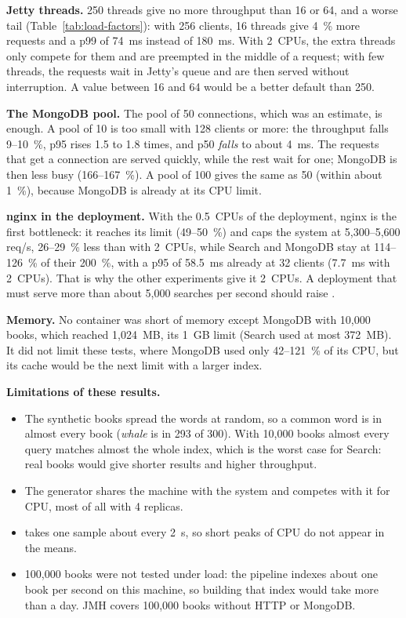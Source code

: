 \textbf{Jetty threads.} 250 threads give no more throughput than 16 or 64, and a worse tail
(Table~\ref{tab:load-factors}): with 256 clients, 16 threads give 4~\% more requests and a p99 of 74~ms instead of
180~ms. With 2~CPUs, the extra threads only compete for them and are preempted in the middle of a request; with few
threads, the requests wait in Jetty's queue and are then served without interruption. A value between 16 and 64 would
be a better default than 250.

\textbf{The MongoDB pool.} The pool of 50 connections, which was an estimate, is enough. A pool of 10 is too small with
128 clients or more: the throughput falls 9--10~\%, p95 rises 1.5 to 1.8 times, and p50 \emph{falls} to about 4~ms.
The requests that get a connection are served quickly, while the rest wait for one; MongoDB is then less busy
(166--167~\%). A pool of 100 gives the same as 50 (within about 1~\%), because MongoDB is already at its CPU limit.

\textbf{nginx in the deployment.} With the 0.5~CPUs of the deployment, nginx is the first bottleneck: it reaches its
limit (49--50~\%) and caps the system at 5,300--5,600 req/s, 26--29~\% less than with 2~CPUs, while Search
and MongoDB stay at 114--126~\% of their 200~\%, with a p95 of 58.5~ms
already at 32 clients (7.7~ms with 2~CPUs). That is why the other experiments give it 2~CPUs. A deployment that must
serve more than about 5,000 searches per second should raise .

\textbf{Memory.} No container was short of memory except MongoDB with 10,000 books, which reached 1,024~MB, its
1~GB limit (Search used at most 372~MB). It did not limit these tests, where MongoDB used only 42--121~\% of its CPU, but its
cache would be the next limit with a larger index.

\textbf{Limitations of these results.}
\begin{itemize}
  \item The synthetic books spread the words at random, so a common word is in almost every book (\emph{whale} is in
        293 of 300). With 10,000 books almost every query matches almost the whole index, which is the worst case for
        Search: real books would give shorter results and higher throughput.
  \item The generator shares the machine with the system and competes with it for CPU, most of all with 4 replicas.
  \item {} takes one sample about every 2~s, so short peaks of CPU do not appear in the means.
  \item 100,000 books were not tested under load: the pipeline indexes about one book per second on this machine, so
        building that index would take more than a day. JMH covers 100,000 books without HTTP or MongoDB.
\end{itemize}

